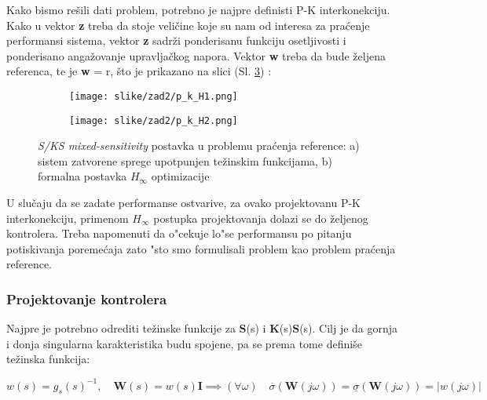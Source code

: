 \documentclass[a4paper,11pt]{article}
\theoremstyle{definition} \newtheorem{deff}{Definicija}[section]
\theoremstyle{definition} \newtheorem{prim}[deff]{Primer}
\theoremstyle{plain} \newtheorem{teor}[deff]{Teorema}
\begin{document}
			Kako bismo rešili dati problem, potrebno je najpre definisti P-K interkonekciju. Kako u vektor \textbf{z} treba da stoje veličine koje su nam od interesa za praćenje performansi sistema, vektor \textbf{z} sadrži ponderisanu funkciju osetljivosti i ponderisano angažovanje upravljačkog napora. Vektor \textbf{w} treba da bude željena referenca, te je \textbf{w} = r, što je prikazano na slici (Sl. \ref{fig:pk2}) :
			
			\begin{figure}[!h]
				\centering
				\begin{subfigure}[b]{0.45\textwidth}
					\texttt{[image: slike/zad2/p\_k\_H1.png]}
					\caption{  }
					\label{fig:pk1}
				\end{subfigure}
				\hfill
				\begin{subfigure}[b]{0.45\textwidth}
					\texttt{[image: slike/zad2/p\_k\_H2.png]}
					\caption{}
					\label{fig:pk2}
				\end{subfigure}
				\hfill
				\caption{  \textit{S/KS mixed-sensitivity} postavka u problemu praćenja reference:
					a) sistem zatvorene sprege upotpunjen težinskim funkcijama,
					b) formalna postavka $H_\infty$ optimizacije}
				
			\end{figure}
			
			U slučaju da se zadate performanse ostvarive, za ovako projektovanu P-K interkonekciju, primenom $H_\infty$ postupka projektovanja dolazi se do željenog kontrolera. Treba napomenuti da o"cekuje lo"se performansu po pitanju potiskivanja poreme\'caja zato "sto smo formulisali problem kao problem pra\'cenja reference.
			
			\clearpage
			
			\subsubsection{Projektovanje kontrolera}
			
			Najpre je potrebno odrediti težinske funkcije za $\textbf{S}$(s) i $\textbf{K}$(s)$\textbf{S}$(s). Cilj je da gornja i donja singularna karakteristika budu spojene, pa se prema tome definiše težinska funkcija: 
			
			\begin{equation}
				w(s) = g_s(s)^{-1}, \quad \textbf{W}(s) = w(s)\textbf{I} \implies (\forall \omega) \quad \overline{\sigma } (\textbf{W}(j\omega))= \underline{\sigma}(\textbf{W}(j\omega)) = |w(j\omega)|
			\end{equation}
			
\end{document}
